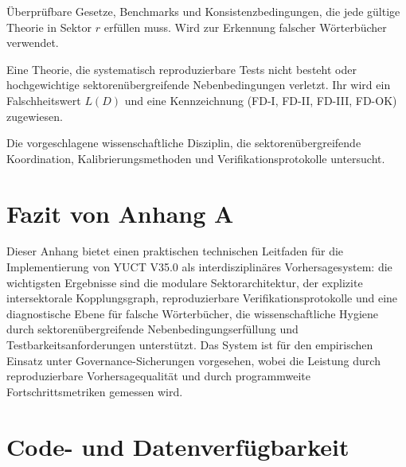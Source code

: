 \documentclass[13pt,a4paper]{article}
\begin{document}
\begin{description}[leftmargin=3cm,style=nextline]
		\item[\(P_r\) (Nebenbedingungsmenge)] 
		Überprüfbare Gesetze, Benchmarks und Konsistenzbedingungen, die jede gültige Theorie in Sektor $r$ erfüllen muss. Wird zur Erkennung falscher Wörterbücher verwendet.
		
		\item[Falsches Wörterbuch] 
		Eine Theorie, die systematisch reproduzierbare Tests nicht besteht oder hochgewichtige sektorenübergreifende Nebenbedingungen verletzt. Ihr wird ein Falschheitswert $L(D)$ und eine Kennzeichnung (FD-I, FD-II, FD-III, FD-OK) zugewiesen.
		
		\item[Koordinationssystemologie] 
		Die vorgeschlagene wissenschaftliche Disziplin, die sektorenübergreifende Koordination, Kalibrierungsmethoden und Verifikationsprotokolle untersucht.
		
	\end{description}
	
	\section*{Fazit von Anhang A}
	
	Dieser Anhang bietet einen praktischen technischen Leitfaden für die Implementierung von YUCT V35.0 als interdisziplinäres Vorhersagesystem: die wichtigsten Ergebnisse sind die modulare Sektorarchitektur, der explizite intersektorale Kopplungsgraph, reproduzierbare Verifikationsprotokolle und eine diagnostische Ebene für falsche Wörterbücher, die wissenschaftliche Hygiene durch sektorenübergreifende Nebenbedingungserfüllung und Testbarkeitsanforderungen unterstützt. Das System ist für den empirischen Einsatz unter Governance-Sicherungen vorgesehen, wobei die Leistung durch reproduzierbare Vorhersagequalität und durch programmweite Fortschrittsmetriken gemessen wird.
	
	\section*{Code- und Datenverfügbarkeit}
	
\end{document}
